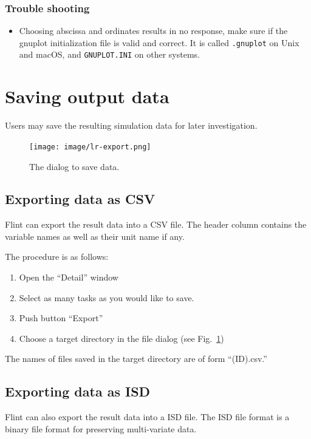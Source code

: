\documentclass[a4paper,10pt]{report}
\begin{document}
\subsubsection{Trouble shooting}
\label{sec:orge2efd37}

\begin{itemize}
\item Choosing abscissa and ordinates results in no response, make sure if the
gnuplot initialization file is valid and correct.
It is called \texttt{.gnuplot} on Unix and macOS, and \texttt{GNUPLOT.INI} on
other systems.
\end{itemize}


\section{Saving output data}
\label{sec:org5afdb45}
Users may save the resulting simulation data for later investigation.

\begin{figure}[htbp]
\centering
\texttt{[image: image/lr-export.png]}
\caption{\label{fig:orgda2ca46}The dialog to save data.}
\end{figure}

\subsection{Exporting data as CSV}
\label{sec:orge5d0714}
Flint can export the result data into a CSV file.
The header column contains the variable names as well as their unit name if any.

The procedure is as follows:

\begin{enumerate}
\item Open the ``Detail'' window
\item Select as many tasks as you would like to save.
\item Push button ``Export''
\item Choose a target directory in the file dialog (see Fig.~\ref{fig:orgda2ca46})
\end{enumerate}

The names of files saved in the target directory are of form ``(ID).csv.''

\subsection{Exporting data as ISD}
\label{sec:org3eb1917}
Flint can also export the result data into a ISD file.
The ISD file format is a binary file format for preserving multi-variate data.
\end{document}
